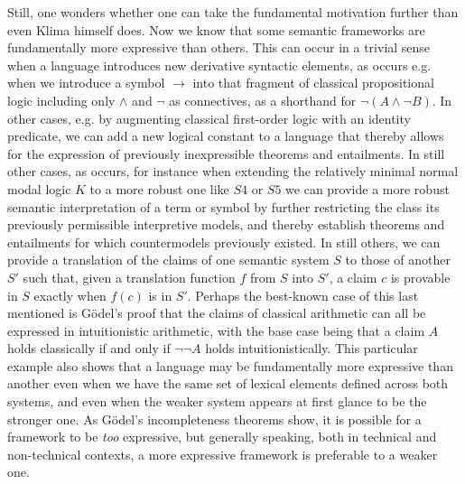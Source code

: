 \documentclass[]{article}
\begin{document}
Still, one wonders whether one can take the fundamental motivation further than even Klima himself does. 
Now we know that some semantic frameworks are fundamentally more expressive than others. 
This can occur in a trivial sense when a language introduces new derivative syntactic elements, 
as occurs e.g. when we introduce a symbol $\rightarrow$ into that fragment of classical propositional logic including only $\wedge $ and $\neg$ as connectives, 
as a shorthand for $\neg(A \wedge \neg B)$. 
In other cases, e.g. by augmenting classical first-order logic with an identity predicate, 
we can add a new logical constant to a language that thereby allows for the expression of previously inexpressible theorems and entailments. 
In still other cases, 
as occurs, for instance when extending the relatively minimal normal modal logic $K$ to a more robust one like $S4$ or $S5$
we can provide a more robust semantic interpretation of a term or symbol by further restricting the class its previously permissible interpretive models, 
and thereby establish theorems and entailments for which countermodels previously existed.
In still others, we can provide a translation of the claims of one semantic system $S$ to those of another $S'$ 
such that, 
given a translation function $f$ from $S$ into $S'$, 
a claim $c$ is provable in $S$ exactly when  $f(c)$ is in $S'$.
Perhaps the best-known case of this last mentioned is G\"{o}del's proof that the claims of classical arithmetic can all be expressed in intuitionistic arithmetic, 
with the base case being that a claim $A$ holds classically if and only if $\neg\neg A$ holds intuitionistically. 
This particular example also shows that a language may be fundamentally more expressive than another even when we have the same set of lexical elements defined across both systems, 
and even when the weaker system appears at first glance to be the stronger one. 
As G\"{o}del's incompleteness theorems show, it is possible for a framework to be \emph{too} expressive, 
but generally speaking, both in technical and non-technical contexts, 
a more expressive framework is preferable to a weaker one.

\end{document}
